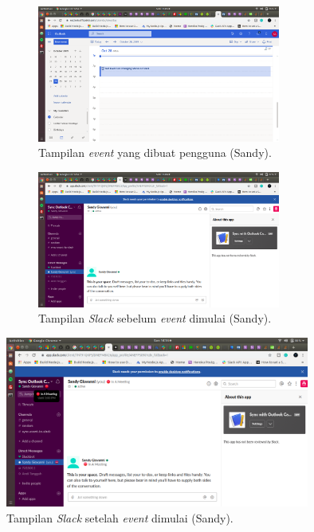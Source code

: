 \begin{figure}[h]
\begin{subfigure}{8.5cm}
  \centering
  \includegraphics[width=8cm]{./Gambar/PengujianSandy/Outlook.png}
  \caption{Tampilan \textit{event} yang dibuat pengguna (Sandy).}
  \label{fig:outlook_sandy}
\end{subfigure}
\begin{subfigure}{8.5cm}
  \centering
  \includegraphics[width=8cm]{./Gambar/PengujianSandy/Slack_Before.png}
  \caption{Tampilan \textit{Slack} sebelum \textit{event} dimulai (Sandy).}
  \label{fig:slack_before_sandy}
\end{subfigure}
\caption{}
\end{figure}

\begin{figure}[h]
  \includegraphics[width=10cm]{./Gambar/PengujianSandy/Slack_After.png}
  \centering
  \caption{Tampilan \textit{Slack} setelah \textit{event} dimulai (Sandy).}
  \label{fig:slack_after_sandy}
\end{figure}


